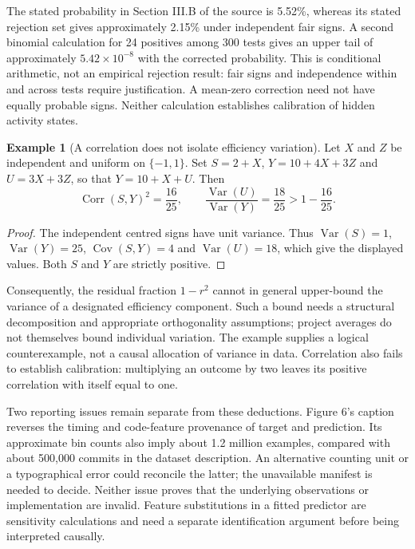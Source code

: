 \documentclass[11pt,a4paper]{amsart}
\theoremstyle{definition}
\newtheorem{example}[proposition]{Example}
\theoremstyle{remark}
\newcommand{\Var}{\operatorname{Var}}
\newcommand{\Cov}{\operatorname{Cov}}
\newcommand{\Corr}{\operatorname{Corr}}
\begin{document}
The stated probability in Section III.B of the source is 5.52\%, whereas its stated rejection set gives approximately 2.15\% under independent fair signs. A second binomial calculation for 24 positives among 300 tests gives an upper tail of approximately $5.42\times10^{-8}$ with the corrected probability. This is conditional arithmetic, not an empirical rejection result: fair signs and independence within and across tests require justification. A mean-zero correction need not have equally probable signs. Neither calculation establishes calibration of hidden activity states.

\begin{example}[A correlation does not isolate efficiency variation]
\label{ex:variance}
Let $X$ and $Z$ be independent and uniform on $\{-1,1\}$. Set $S=2+X$, $Y=10+4X+3Z$ and $U=3X+3Z$, so that $Y=10+X+U$. Then
\begin{equation}
\label{eq:variance}
 \Corr(S,Y)^2=\frac{16}{25},\qquad
 \frac{\Var(U)}{\Var(Y)}=\frac{18}{25}>1-\frac{16}{25}.
\end{equation}
\end{example}
\begin{proof}
The independent centred signs have unit variance. Thus $\Var(S)=1$, $\Var(Y)=25$, $\Cov(S,Y)=4$ and $\Var(U)=18$, which give the displayed values. Both $S$ and $Y$ are strictly positive.
\end{proof}

Consequently, the residual fraction $1-r^2$ cannot in general upper-bound the variance of a designated efficiency component. Such a bound needs a structural decomposition and appropriate orthogonality assumptions; project averages do not themselves bound individual variation. The example supplies a logical counterexample, not a causal allocation of variance in data. Correlation also fails to establish calibration: multiplying an outcome by two leaves its positive correlation with itself equal to one.

Two reporting issues remain separate from these deductions. Figure 6's caption reverses the timing and code-feature provenance of target and prediction. Its approximate bin counts also imply about 1.2 million examples, compared with about 500,000 commits in the dataset description. An alternative counting unit or a typographical error could reconcile the latter; the unavailable manifest is needed to decide. Neither issue proves that the underlying observations or implementation are invalid. Feature substitutions in a fitted predictor are sensitivity calculations and need a separate identification argument before being interpreted causally.
\end{document}
